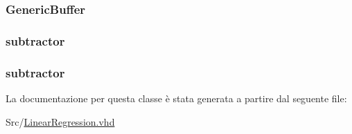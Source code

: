 \subsubsection[{\texorpdfstring{pipestage2\+\_\+buff\+\_\+s6}{pipestage2_buff_s6}}]{ {\bfseries \textcolor{vhdlchar}{Generic\+Buffer}\textcolor{vhdlchar}{ }} \hspace{0.3cm}{\ttfamily [Instantiation]}}\hypertarget{class_linear_regression_1_1_structural_af53a49707b23b6676f25d84a39920009}{}\label{class_linear_regression_1_1_structural_af53a49707b23b6676f25d84a39920009}
\subsubsection[{\texorpdfstring{sub5}{sub5}}]{ {\bfseries \textcolor{vhdlchar}{subtractor}\textcolor{vhdlchar}{ }} \hspace{0.3cm}{\ttfamily [Instantiation]}}\hypertarget{class_linear_regression_1_1_structural_a3fd26266a39105aca90e2b7b13923619}{}\label{class_linear_regression_1_1_structural_a3fd26266a39105aca90e2b7b13923619}
\subsubsection[{\texorpdfstring{sub6}{sub6}}]{ {\bfseries \textcolor{vhdlchar}{subtractor}\textcolor{vhdlchar}{ }} \hspace{0.3cm}{\ttfamily [Instantiation]}}\hypertarget{class_linear_regression_1_1_structural_aa1ef9174550e2c151dd776bd1b40a330}{}\label{class_linear_regression_1_1_structural_aa1ef9174550e2c151dd776bd1b40a330}


La documentazione per questa classe è stata generata a partire dal seguente file\+:\begin{DoxyCompactItemize}
\item 
Src/\hyperlink{_linear_regression_8vhd}{Linear\+Regression.\+vhd}\end{DoxyCompactItemize}
